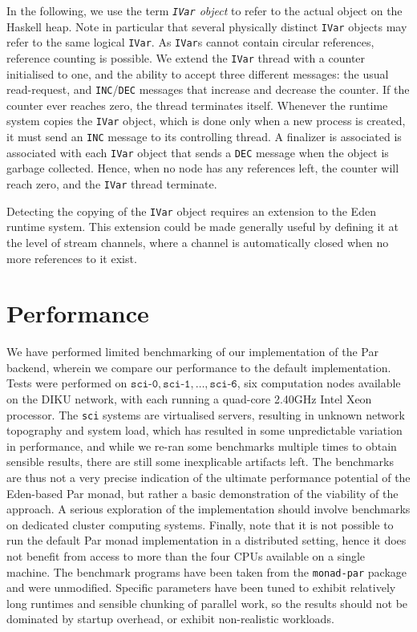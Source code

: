 \documentclass[a4paper, oneside, final]{memoir}
\begin{document}
In the following, we use the term \textit{\texttt{IVar} object} to
refer to the actual object on the Haskell heap.  Note in particular
that several physically distinct \texttt{IVar} objects may refer to
the same logical \texttt{IVar}.  As \texttt{IVar}s cannot contain
circular references, reference counting is possible.  We extend the
\texttt{IVar} thread with a counter initialised to one, and the
ability to accept three different messages: the usual read-request,
and \texttt{INC}/\texttt{DEC} messages that increase and decrease the
counter.  If the counter ever reaches zero, the thread terminates
itself.  Whenever the runtime system copies the \texttt{IVar} object,
which is done only when a new process is created, it must send an
\texttt{INC} message to its controlling thread.  A finalizer is
associated is associated with each \texttt{IVar} object that sends a
\texttt{DEC} message when the object is garbage collected.  Hence,
when no node has any references left, the counter will reach zero, and
the \texttt{IVar} thread terminate.

Detecting the copying of the \texttt{IVar} object requires an
extension to the Eden runtime system.  This extension could be made
generally useful by defining it at the level of stream channels, where
a channel is automatically closed when no more references to it exist.

\section{Performance}

We have performed limited benchmarking of our implementation of the
Par backend, wherein we compare our performance to the default
implementation.  Tests were performed on
$\texttt{sci-0},\texttt{sci-1},\ldots,\texttt{sci-6}$, six computation
nodes available on the DIKU network, with each running a quad-core
2.40GHz Intel Xeon processor.  The \texttt{sci} systems are
virtualised servers, resulting in unknown network topography and
system load, which has resulted in some unpredictable variation in
performance, and while we re-ran some benchmarks multiple times to
obtain sensible results, there are still some inexplicable artifacts
left.  The benchmarks are thus not a very precise indication of the
ultimate performance potential of the Eden-based Par monad, but rather
a basic demonstration of the viability of the approach.  A serious
exploration of the implementation should involve benchmarks on
dedicated cluster computing systems.  Finally, note that it is not
possible to run the default Par monad implementation in a distributed
setting, hence it does not benefit from access to more than the four
CPUs available on a single machine.  The benchmark programs have been
taken from the \texttt{monad-par} package and were unmodified.
Specific parameters have been tuned to exhibit relatively long
runtimes and sensible chunking of parallel work, so the results should
not be dominated by startup overhead, or exhibit non-realistic
workloads.
\end{document}
